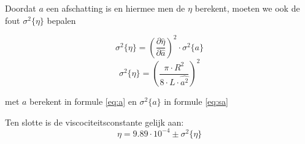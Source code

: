 Doordat $a$ een afschatting is en hiermee men de $\eta$ berekent,
moeten we ook de fout $\sigma ^2 \{ \eta \}$ bepalen

\begin{equation}
    \sigma ^2 \{ \eta \} = \left(\frac{\partial \hat{\eta}}{\partial \hat{a}}\right)^2 \cdot \sigma ^2 \{a\}
\end{equation}
\begin{equation*}
    \sigma ^2 \{ \eta \} = \left(\frac{\pi \cdot R^2}{8 \cdot L \cdot \hat{a^2}}\right)^2
\end{equation*}

met $a$ berekent in formule \eqref{eq:a} en $\sigma ^2 \{a\}$ in formule \eqref{eq:sa}

Ten slotte is de viscociteitsconstante gelijk aan:
\begin{equation*}
    \eta = 9.89 \cdot 10^{-4} \pm \sigma ^2 \{ \eta \}
\end{equation*}




